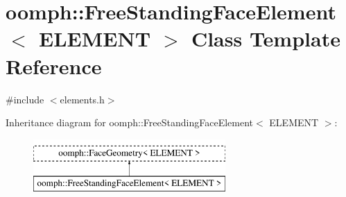 \hypertarget{classoomph_1_1FreeStandingFaceElement}{}\section{oomph\+:\+:Free\+Standing\+Face\+Element$<$ E\+L\+E\+M\+E\+NT $>$ Class Template Reference}
\label{classoomph_1_1FreeStandingFaceElement}


{\ttfamily \#include $<$elements.\+h$>$}

Inheritance diagram for oomph\+:\+:Free\+Standing\+Face\+Element$<$ E\+L\+E\+M\+E\+NT $>$\+:\begin{figure}[H]
\begin{center}
\leavevmode
\includegraphics[height=2.000000cm]{classoomph_1_1FreeStandingFaceElement}
\end{center}
\end{figure}
